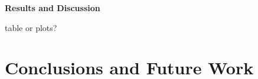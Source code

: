 \documentclass{llncs}
\begin{document}
\smallskip
\textbf{Results and Discussion}


table or plots?


\section{Conclusions and Future Work}
\label{sec-concl}



%
 

\end{document}

